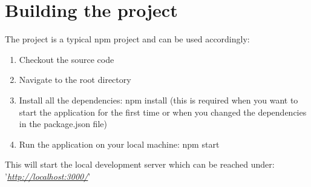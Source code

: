 \section{Building the project}
The project is a typical npm project and can be used accordingly:
\begin{enumerate}
    \item Checkout the source code
    \item Navigate to the root directory
    \item Install all the dependencies: npm install (this is required when you want to start the application for the first time or when you changed the dependencies in the package.json file)
    \item Run the application on your local machine: npm start
\end{enumerate}

\noindent This will start the local development server which can be reached under: '\textit{\url{http://localhost:3000/}}'